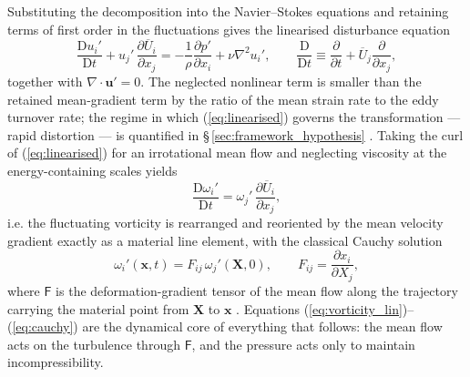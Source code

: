 \documentclass[lineno]{JFM-FLM_Au}
\begin{document}
Substituting the decomposition into the Navier--Stokes equations and
retaining terms of first order in the fluctuations gives the linearised
disturbance equation
\begin{equation}
  \frac{\mathrm{D}u_i'}{\mathrm{D}t}
  + u_j'\,\frac{\partial \overline{U}_i}{\partial x_j}
  = -\frac{1}{\rho}\frac{\partial p'}{\partial x_i}
  + \nu\nabla^2 u_i',
  \qquad
  \frac{\mathrm{D}}{\mathrm{D}t}
  \equiv \frac{\partial}{\partial t}
  + \overline{U}_j\frac{\partial}{\partial x_j},
  \label{eq:linearised}
\end{equation}
together with $\nabla\cdot\boldsymbol{u}' = 0$. The neglected nonlinear
term is smaller than the retained mean-gradient term by the ratio of the
mean strain rate to the eddy turnover rate; the regime in which
(\ref{eq:linearised}) governs the transformation --- rapid distortion ---
is quantified in \S\,\ref{sec:framework_hypothesis}
\citep{BatchelorProudman1954,HuntCarruthers1990}. Taking the curl of
(\ref{eq:linearised}) for an irrotational mean flow and neglecting
viscosity at the energy-containing scales yields
\begin{equation}
  \frac{\mathrm{D}\omega_i'}{\mathrm{D}t}
  = \omega_j'\,\frac{\partial \overline{U}_i}{\partial x_j},
  \label{eq:vorticity_lin}
\end{equation}
i.e. the fluctuating vorticity is rearranged and reoriented by the mean
velocity gradient exactly as a material line element, with the classical
Cauchy solution
\begin{equation}
  \omega_i'(\boldsymbol{x},t)
  = F_{ij}\,\omega_j'(\boldsymbol{X},0),
  \qquad
  F_{ij} = \frac{\partial x_i}{\partial X_j},
  \label{eq:cauchy}
\end{equation}
where $\mathsf{F}$ is the deformation-gradient tensor of the mean flow
along the trajectory carrying the material point from $\boldsymbol{X}$ to
$\boldsymbol{x}$ \citep{BatchelorProudman1954,HuntCarruthers1990}.
Equations (\ref{eq:vorticity_lin})--(\ref{eq:cauchy}) are the dynamical
core of everything that follows: the mean flow acts on the turbulence
through $\mathsf{F}$, and the pressure acts only to maintain
incompressibility.
\end{document}
